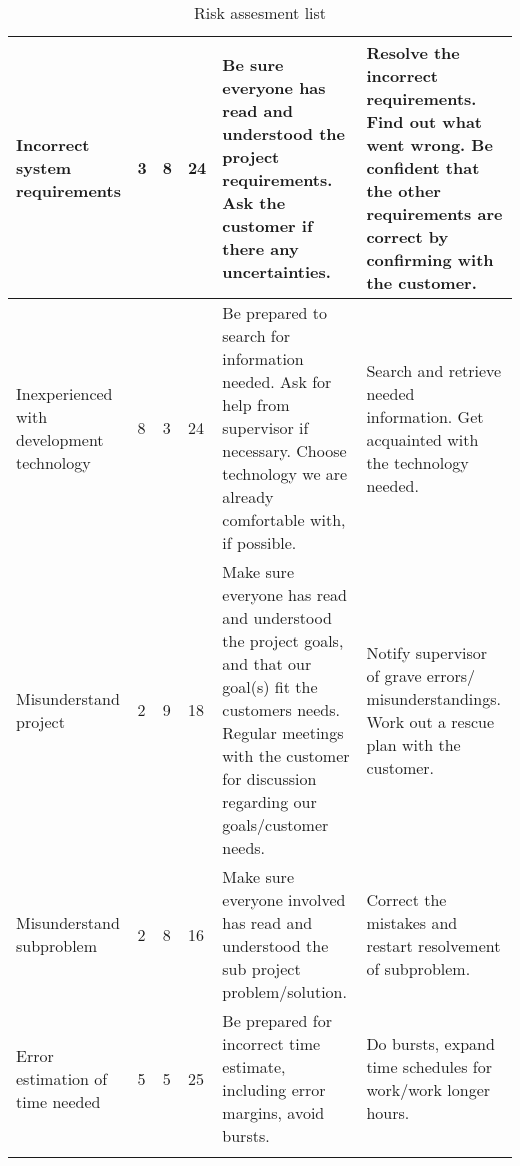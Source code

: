 {\begin{longtable}{| p{2.5cm} | p{1.5cm} | p{1.5cm} | p{1.5cm} | p{3cm} | p{3cm} |}
	Incorrect system requirements & 3 & 8 & 24 & Be sure everyone has read and 
		understood the project requirements. Ask the customer if there any 
		uncertainties. & Resolve the incorrect requirements. Find out what went 
		wrong. Be confident that the other requirements are correct by 
		confirming with the customer.
	\\\hline
	Inexperienced with development technology & 8 & 3 & 24 & Be prepared to 
		search for information needed. Ask for help from supervisor if 
		necessary. Choose technology we are already comfortable with, if 
		possible. & Search and retrieve needed information. Get acquainted with 
		the technology needed. 
	\\\hline
	Misunderstand project & 2 & 9 & 18 & Make sure everyone has read and 
		understood the project goals, and that our goal(s) fit the customers 
		needs. Regular meetings with the customer for discussion regarding our 
		goals/customer needs. & Notify supervisor of grave errors/
		misunderstandings. Work out a rescue plan with the customer. 
	\\\hline
	Misunderstand subproblem & 2 & 8 & 16 & Make sure everyone involved has 
		read and understood the sub project problem/solution. & Correct the 
		mistakes and restart resolvement of subproblem. 
	\\\hline
	Error estimation of time needed & 5 & 5 & 25 & Be prepared for incorrect 
		time estimate, including error margins, avoid bursts. & Do bursts, 
		expand time schedules for work/work longer hours. 
	\\\hline
\caption{Risk assesment list}
\label{fig:risklist}
\end{longtable}
}

